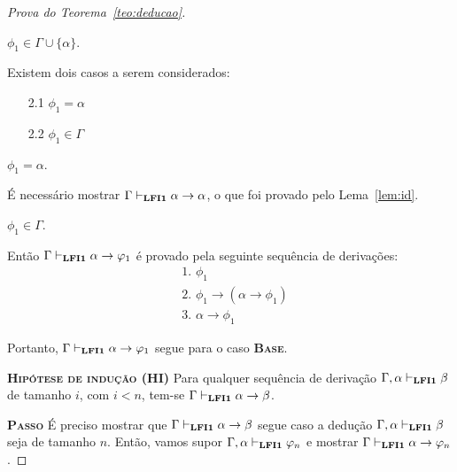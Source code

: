\begin{proof}[Prova do Teorema~\ref{teo:deducao}]
\begin{provaporcasos}
                \casodeprova{} $\phi_{1} \in \Gamma \cup \{\alpha\}$. 
                
                Existem dois casos a serem considerados:

                \begin{enumerate}
                    \item[2.1] $\phi_{1} = \alpha$
                    \item[2.2] $\phi_{1} \in \Gamma$
                \end{enumerate}

                \begin{provaporsubcasos}
                    \subcasodeprova{} $\phi_{1} = \alpha$. 
                    
                        É necessário mostrar $\Gamma \vdash_{{\normalfont\textbf{LFI1}}{}} \alpha \to \alpha$, o que foi provado pelo Lema~\ref{lem:id}.

                    \subcasodeprova{} $\phi_{1} \in \Gamma$.
                    
                        Então $\Gamma \vdash_{{\normalfont\textbf{LFI1}}{}} \alpha \to \varphi_{1}$ é provado pela seguinte sequência de derivações:
                        \begin{align*}
                            & \text{1. } \phi_{1} \tag{Premissa}\\
                            & \text{2. } \phi_{1} \to (\alpha \to \phi_{1}) \tag{Ax1}\\
                            & \text{3. } \alpha \to \phi_{1} \tag{MP 1, 2}
                        \end{align*}
                \end{provaporsubcasos}
                
            \end{provaporcasos}
            
            Portanto, $\Gamma \vdash_{{\normalfont\textbf{LFI1}}{}} \alpha \to \varphi_{1}$ segue para o caso \textbf{\textsc{Base}}.

        \noindent \textbf{\textsc{Hipótese de indução (HI)}} Para qualquer sequência de derivação $\Gamma, \alpha \vdash_{{\normalfont\textbf{LFI1}}{}} \beta$ de tamanho $i$, com $i < n$, tem-se $\Gamma \vdash_{{\normalfont\textbf{LFI1}}{}} \alpha \to \beta$. 

        \noindent \textbf{\textsc{Passo}}
        É preciso mostrar que $\Gamma \vdash_{{\normalfont\textbf{LFI1}}{}} \alpha \to \beta$ segue caso a dedução $\Gamma, \alpha \vdash_{{\normalfont\textbf{LFI1}}{}} \beta$ seja de tamanho $n$. Então, vamos supor $\Gamma, \alpha \vdash_{{\normalfont\textbf{LFI1}}{}} \varphi_{n}$ e mostrar $\Gamma \vdash_{{\normalfont\textbf{LFI1}}{}} \alpha \to \varphi_{n}$.
        

\end{proof}
